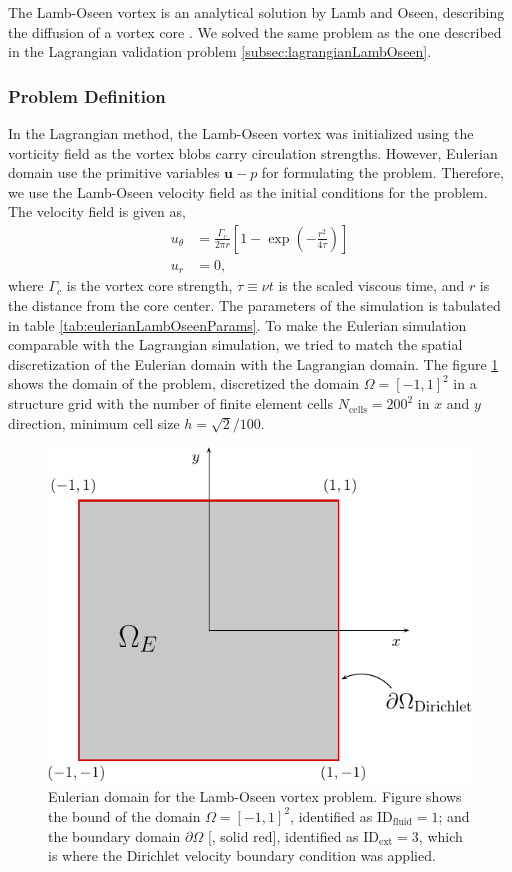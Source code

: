 The Lamb-Oseen vortex is an analytical solution by Lamb and Oseen, describing the diffusion of a vortex core \cite{Tryggeson2007}. We solved the same problem as the one described in the Lagrangian validation problem \ref{subsec:lagrangianLambOseen}. 

\subsubsection*{Problem Definition}
In the Lagrangian method, the Lamb-Oseen vortex was initialized using the vorticity field as the vortex blobs carry circulation strengths. However, Eulerian domain use the primitive variables $\mathbf{u}-p$ for formulating the problem. Therefore, we use the Lamb-Oseen velocity field as the initial conditions for the problem. The velocity field is given as,
	\begin{subequations}
	\begin{align}
	u_{\theta} &= \frac{\Gamma_c}{2\pi r} \left[1-\exp\left(-\frac{r^2}{4\tau}\right)\right]\\
	u_r &= 0,
	\end{align}
	\end{subequations}
where $\Gamma_c$ is the vortex core strength, $\tau \equiv \nu t$ is the scaled viscous time, and $r$ is the distance from the core center. The parameters of the simulation is tabulated in table \ref{tab:eulerianLambOseenParams}. To make the Eulerian simulation comparable with the Lagrangian simulation, we tried to match the spatial discretization of the Eulerian domain with the Lagrangian domain. The figure \ref{fig:lambOseenDomainDefinition} shows the domain of the problem, discretized the domain $\Omega = \left[-1,1\right]^2$ in a structure grid with the number of finite element cells $N_{\mathrm{cells}}=200^2$ in $x$ and $y$ direction, minimum cell size $h=\sqrt{2}/100$. 

	\begin{figure}[t]
	\centering
	\includegraphics[width=0.5\linewidth]{./figures/eulerian/lambOseenDomainDefinition-crop.pdf}
	\caption{Eulerian domain for the Lamb-Oseen vortex problem. Figure shows the bound of the domain $\Omega = \left[-1,1\right]^2$, identified as $\mathrm{ID}_{\mathrm{fluid}} = 1$; and the boundary domain $\partial \Omega$ [{\color{plotRed}{---}}, solid red], identified as  $\mathrm{ID}_{\mathrm{ext}} = 3$, which is where the Dirichlet velocity boundary condition was applied.}
	\label{fig:lambOseenDomainDefinition}
	\end{figure}

